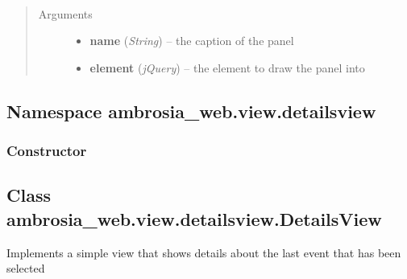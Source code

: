 \documentclass[letterpaper,10pt,english]{sphinxmanual}
\begin{document}
\begin{fulllineitems}
\label{ambrosia_web.view.Panel:ambrosia_web.view.Panel}~\begin{quote}\begin{description}
\item[{Arguments}] \leavevmode\begin{itemize}
\item {} 
\textbf{name} (\emph{String}) -- the caption of the panel

\item {} 
\textbf{element} (\emph{jQuery}) -- the element to draw the panel into

\end{itemize}

\end{description}\end{quote}

\end{fulllineitems}



\subsection{Namespace ambrosia\_web.view.detailsview}
\label{ambrosia_web.view.detailsview:namespace-ambrosia-web-view-detailsview}\label{ambrosia_web.view.detailsview::doc}

\subsubsection{Constructor}
\label{ambrosia_web.view.detailsview:constructor}

\begin{fulllineitems}
\label{ambrosia_web.view.detailsview:ambrosia_web.view.detailsview}
\end{fulllineitems}



\subsection{Class ambrosia\_web.view.detailsview.DetailsView}
\label{ambrosia_web.view.detailsview.DetailsView::doc}\label{ambrosia_web.view.detailsview.DetailsView:class-ambrosia-web-view-detailsview-detailsview}
Implements a simple view that shows details about the last event that has been selected
\end{document}
